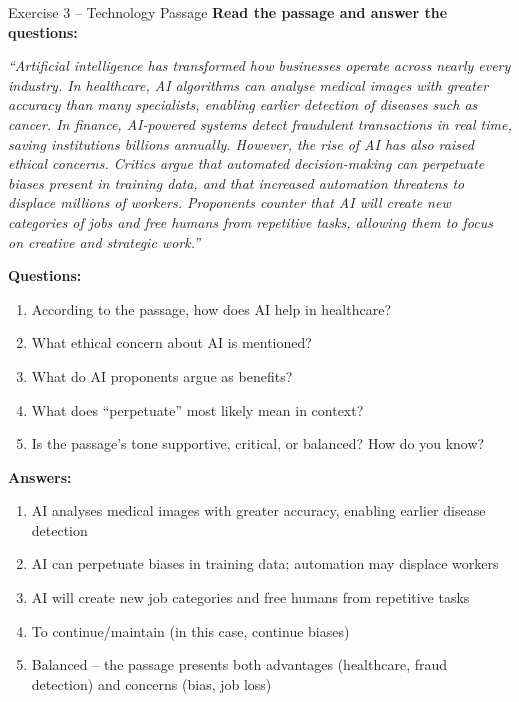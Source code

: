 \documentclass[12pt,a4paper]{article}
\begin{document}
\begin{practicebox}{Exercise 3 -- Technology Passage}
\textbf{Read the passage and answer the questions:}

\textit{``Artificial intelligence has transformed how businesses operate across nearly every industry. In healthcare, AI algorithms can analyse medical images with greater accuracy than many specialists, enabling earlier detection of diseases such as cancer. In finance, AI-powered systems detect fraudulent transactions in real time, saving institutions billions annually. However, the rise of AI has also raised ethical concerns. Critics argue that automated decision-making can perpetuate biases present in training data, and that increased automation threatens to displace millions of workers. Proponents counter that AI will create new categories of jobs and free humans from repetitive tasks, allowing them to focus on creative and strategic work.''}

\textbf{Questions:}
\begin{enumerate}[noitemsep]
    \item According to the passage, how does AI help in healthcare?
    \item What ethical concern about AI is mentioned?
    \item What do AI proponents argue as benefits?
    \item What does ``perpetuate'' most likely mean in context?
    \item Is the passage's tone supportive, critical, or balanced? How do you know?
\end{enumerate}

\textbf{Answers:}
\begin{enumerate}[noitemsep]
    \item AI analyses medical images with greater accuracy, enabling earlier disease detection
    \item AI can perpetuate biases in training data; automation may displace workers
    \item AI will create new job categories and free humans from repetitive tasks
    \item To continue/maintain (in this case, continue biases)
    \item Balanced -- the passage presents both advantages (healthcare, fraud detection) and concerns (bias, job loss)
\end{enumerate}
\end{practicebox}
\end{document}
